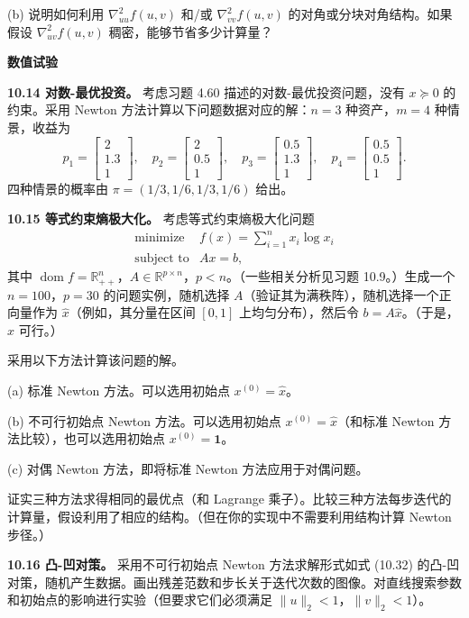 \documentclass[UTF8,12pt,a4paper,fontset=fandol]{ctexart}
\begin{document}
(b) 说明如何利用 $\nabla_{uu}^2f(u,v)$ 和/或 $\nabla_{vv}^2f(u,v)$ 的对角或分块对角结构。如果假设 $\nabla_{uv}^2f(u,v)$ 稠密，能够节省多少计算量？

\noindent\textbf{数值试验}

\noindent\textbf{10.14 对数-最优投资。}\quad
考虑习题 4.60 描述的对数-最优投资问题，没有 $x\succeq0$ 的约束。采用 Newton 方法计算以下问题数据对应的解：$n=3$ 种资产，$m=4$ 种情景，收益为
\[
p_1=
\begin{bmatrix}
2\\
1.3\\
1
\end{bmatrix},
\quad
p_2=
\begin{bmatrix}
2\\
0.5\\
1
\end{bmatrix},
\quad
p_3=
\begin{bmatrix}
0.5\\
1.3\\
1
\end{bmatrix},
\quad
p_4=
\begin{bmatrix}
0.5\\
0.5\\
1
\end{bmatrix}.
\]
四种情景的概率由 $\pi=(1/3,1/6,1/3,1/6)$ 给出。

\noindent\textbf{10.15 等式约束熵极大化。}\quad
考虑等式约束熵极大化问题
\[
\begin{array}{ll}
\mbox{minimize} & f(x)=\displaystyle\sum_{i=1}^n x_i\log x_i\\
\mbox{subject to} & Ax=b,
\end{array}
\]
其中 $\operatorname{dom} f=\mathbb{R}_{++}^n$，$A\in\mathbb{R}^{p\times n}$，$p<n$。（一些相关分析见习题 10.9。）生成一个 $n=100$，$p=30$ 的问题实例，随机选择 $A$（验证其为满秩阵），随机选择一个正向量作为 $\hat{x}$（例如，其分量在区间 $[0,1]$ 上均匀分布），然后令 $b=A\hat{x}$。（于是，$\hat{x}$ 可行。）

采用以下方法计算该问题的解。

(a) 标准 Newton 方法。可以选用初始点 $x^{(0)}=\hat{x}$。

(b) 不可行初始点 Newton 方法。可以选用初始点 $x^{(0)}=\hat{x}$（和标准 Newton 方法比较），也可以选用初始点 $x^{(0)}=\mathbf{1}$。

(c) 对偶 Newton 方法，即将标准 Newton 方法应用于对偶问题。

证实三种方法求得相同的最优点（和 Lagrange 乘子）。比较三种方法每步迭代的计算量，假设利用了相应的结构。（但在你的实现中不需要利用结构计算 Newton 步径。）

\noindent\textbf{10.16 凸-凹对策。}\quad
采用不可行初始点 Newton 方法求解形式如式 (10.32) 的凸-凹对策，随机产生数据。画出残差范数和步长关于迭代次数的图像。对直线搜索参数和初始点的影响进行实验（但要求它们必须满足 $\|u\|_2<1$，$\|v\|_2<1$）。
\end{document}
